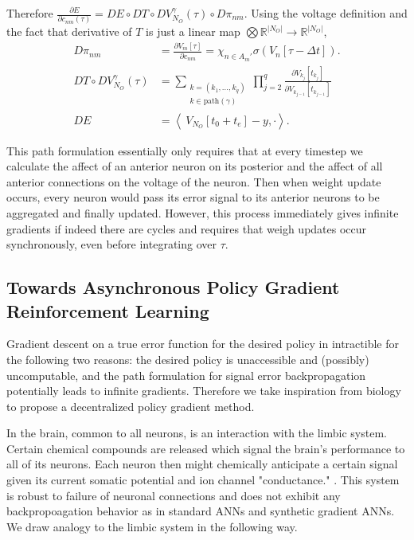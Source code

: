 	Therefore $\frac{\partial E}{\partial c_{nm}(\tau)} = DE \circ DT \circ DV_{N_O}^\gamma(\tau) \circ D\pi_{nm}$. Using the voltage definition and the fact that derivative of $T$ is just a linear map $\bigotimes \mathbb{R}^{|N_O|} \to \mathbb{R}^{|N_O|}$,
	\begin{equation}
		\begin{aligned}
			D\pi_{nm} &= \frac{\partial V_m[\tau]}{\partial c_{nm}} = \chi_{n \in A_m'} \sigma(V_n[\tau-\Delta t]). \\
			DT\circ DV^{\gamma}_{N_O}(\tau)
				&= \sum_{
					\substack{
						k = (k_1, \dots, k_q)\\
						k \in \text{path}(\gamma)
					}} 
				\prod_{j=2}^{q}
				 	\frac{\partial V_{k_j}[t_{k_j}]}{\partial V_{k_{j-1}}[t_{k_{j-1}}]} \\
				 	DE &= \left\langle\ V_{N_O}[t_0 + t_e] - y, \cdot \right\rangle. 
		\end{aligned}
	\end{equation}

	This path formulation essentially only requires that at every timestep we calculate the affect of an anterior neuron on its posterior and the affect of all anterior connections on the voltage of the neuron.  Then when weight update occurs, every neuron would pass its error signal to its anterior neurons to be aggregated and finally updated. However, this process immediately gives infinite gradients if indeed there are cycles and requires that weigh updates occur synchronously, even before integrating over $\tau.$

\subsection{Towards Asynchronous Policy Gradient Reinforcement Learning}

	Gradient descent on a true error function for the desired policy in intractible for the following two reasons: the desired policy is unaccessible and (possibly) uncomputable, and the path formulation for signal error backpropagation potentially leads to infinite gradients. Therefore we take inspiration from biology to propose a decentralized policy gradient method.

	In the brain, common to all neurons, is an interaction with the limbic system.  Certain chemical compounds are released which signal the brain's performance to all of its neurons. Each neuron then might chemically anticipate a certain signal given its current somatic potential and ion channel "conductance."  . This system is robust to failure of neuronal connections and does not exhibit any backpropoagation behavior as in standard ANNs and synthetic gradient ANNs. We draw analogy to the limbic system in the following way. 


